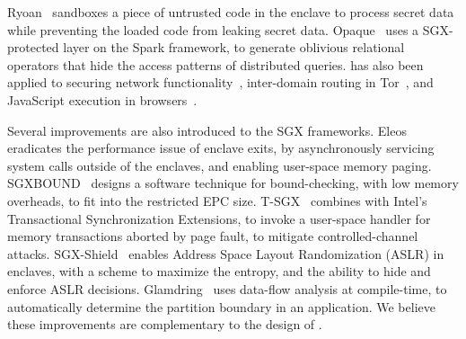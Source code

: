 Ryoan~\cite{hunt16ryoan} sandboxes a piece of untrusted code in the enclave
to process secret data while preventing the loaded code from leaking secret data.
Opaque~\cite{zheng2017opaque} uses a SGX-protected layer on the Spark framework, to generate oblivious relational operators that hide the access patterns of distributed queries.
\sgx{} has also been applied to securing network functionality~\cite{shih2016s},
inter-domain routing in Tor~\cite{kim2015first},
and JavaScript execution in browsers~\cite{goltzsche17trustjs}.



Several improvements are also introduced to the SGX frameworks.
Eleos~\cite{orenbach17eleos} eradicates the performance issue of enclave exits, by asynchronously servicing system calls outside of the enclaves, and enabling user-space memory paging.
SGXBOUND~\cite{kuvaiskii17sgxbound} designs a software technique for bound-checking, with low memory overheads,
to fit into the restricted EPC size.
T-SGX~\cite{shih2017t-sgx} combines \sgx{} with Intel's Transactional Synchronization Extensions, to invoke a user-space handler for memory transactions aborted by page fault, to mitigate controlled-channel attacks.
SGX-Shield~\cite{seo2017sgx-shield} enables Address Space Layout Randomization (ASLR) in enclaves, with a scheme to maximize the entropy, and the ability to hide and enforce ASLR decisions.
Glamdring~\cite{glamdring} uses data-flow analysis at compile-time, to automatically determine the partition boundary in an application.
We believe these improvements are complementary to the design of \graphenesgx{}.


